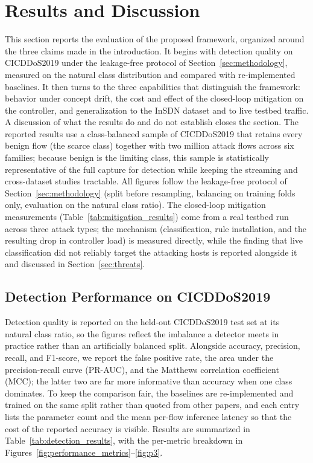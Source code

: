 \documentclass[ASNA,twocolumn]{USG} %
\begin{document}
\section{Results and Discussion}
\label{sec:results_and_discussion}
This section reports the evaluation of the proposed framework, organized around the three claims made in the introduction. It begins with detection quality on CICDDoS2019 under the leakage-free protocol of Section~\ref{sec:methodology}, measured on the natural class distribution and compared with re-implemented baselines. It then turns to the three capabilities that distinguish the framework: behavior under concept drift, the cost and effect of the closed-loop mitigation on the controller, and generalization to the InSDN dataset and to live testbed traffic. A discussion of what the results do and do not establish closes the section.
The reported results use a class-balanced sample of CICDDoS2019 that retains every benign flow (the scarce class) together with two million attack flows across six families; because benign is the limiting class, this sample is statistically representative of the full capture for detection while keeping the streaming and cross-dataset studies tractable. All figures follow the leakage-free protocol of Section~\ref{sec:methodology} (split before resampling, balancing on training folds only, evaluation on the natural class ratio). The closed-loop mitigation measurements (Table~\ref{tab:mitigation_results}) come from a real testbed run across three attack types; the mechanism (classification, rule installation, and the resulting drop in controller load) is measured directly, while the finding that live classification did not reliably target the attacking hosts is reported alongside it and discussed in Section~\ref{sec:threats}.

\subsection{Detection Performance on CICDDoS2019}
\label{sec:detection_results}

Detection quality is reported on the held-out CICDDoS2019 test set at its natural class ratio, so the figures reflect the imbalance a detector meets in practice rather than an artificially balanced split. Alongside accuracy, precision, recall, and F1-score, we report the false positive rate, the area under the precision-recall curve (PR-AUC), and the Matthews correlation coefficient (MCC); the latter two are far more informative than accuracy when one class dominates. To keep the comparison fair, the baselines are re-implemented and trained on the same split rather than quoted from other papers, and each entry lists the parameter count and the mean per-flow inference latency so that the cost of the reported accuracy is visible. Results are summarized in Table~\ref{tab:detection_results}, with the per-metric breakdown in Figures~\ref{fig:performance_metrics}--\ref{fig:p3}.
\end{document}
